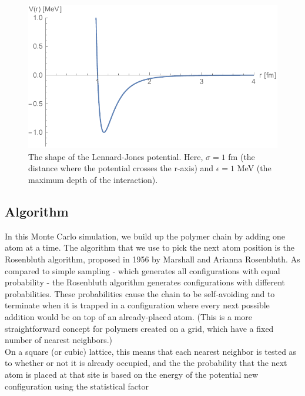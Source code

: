 \documentclass{article}
\begin{document}
\begin{multicols}{2}
\begin{figure}[H]
\begin{center}
\includegraphics[width=\linewidth]{Figures/VLJ.pdf}
\caption{The shape of the Lennard-Jones potential.  Here, $\sigma=1$ fm (the distance where the potential crosses the r-axis) and $\epsilon =1$ MeV (the maximum depth of the interaction).}
\label{VLJfig}
\end{center}
\end{figure}

\subsection{Algorithm}
\label{RA}

In this Monte Carlo simulation, we build up the polymer chain by adding one atom at a time.  The algorithm that we use to pick the next atom position is the Rosenbluth algorithm, proposed in 1956 by Marshall and Arianna Rosenbluth.  As compared to simple sampling - which generates all configurations with equal probability - the Rosenbluth algorithm generates configurations with different probabilities.  These probabilities cause the chain to be self-avoiding and to terminate when it is trapped in a configuration where every next possible addition would be on top of an already-placed atom.  \cite{Rosenbluth}  (This is a more straightforward concept for polymers created on a grid, which have a fixed number of nearest neighbors.)  \\

On a square (or cubic) lattice, this means that each nearest neighbor is tested as to whether or not it is already occupied, and the the probability that the next atom is placed at that site is based on the energy of the potential new configuration using the statistical factor


\end{multicols}
\end{document}
